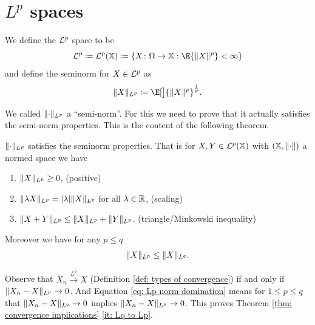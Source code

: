 \section[\texorpdfstring{\(L^p\)}{Lp} spaces]{\texorpdfstring{\(L^p\)}{Lp} spaces  }
\label{sec: Lp spaces}

\begin{definition}
    We define the \(\mathcal{L}^p\) space to be
    \[
        \cL^p \coloneq \cL^p(\domain) \coloneq \set{X\colon \Omega \to \domain : \E{\norm{X}^p} < \infty}
    \]
    and define the seminorm for \(X\in \mathcal{L}^p\) as
    \[
        \norm{X}_{L^p} \coloneq \E[\big]{\norm{X}^p}^{\frac1p}.
    \]
\end{definition}

We called \(\lVert\cdot\rVert_{L^p}\) a ``semi-norm''. For this we need to prove that
it actually satisfies the semi-norm properties. This is the content of the
following theorem.

\begin{theorem}
    \label{thm: seminorm properties}
    \(\lVert\cdot\rVert_{L^p}\) satisfies the seminorm properties. That is for \(X,Y
    \in \mathcal{L}^p(\mathbb{X})\) with \((\mathbb{X}, \lVert\cdot\rVert)\) a normed space we have
    \begin{enumerate}[label=(\roman*)]
        \item\label{it: positive}
        \(\lVert X\rVert_{L^p} \ge 0\),
        \hfill (positive)
        \item\label{it: scaling}
        \(\lVert\lambda X\rVert_{L^p} = |\lambda| \lVert X\rVert_{L^p}\)
        for all \(\lambda \in \mathbb{R}\),
        \hfill (scaling)
        \item\label{it: triangle inequality}
        \(\lVert X + Y\rVert_{L^p} \le \lVert X\rVert_{L^p} + \lVert Y\rVert_{L^p}\).
        \hfill (triangle/Minkowski inequality)
    \end{enumerate}
    Moreover we have for any \(p \le q\)
    \begin{equation}
        \label{eq: Lp norm domination}
        \lVert X\rVert_{L^p} \le \lVert X\rVert_{L^q}.
    \end{equation}
\end{theorem}

\begin{remark}[\(L^p\) convergence]
    \label{rem: Lp convergence}
    Observe that \(X_n \xrightarrow{L^p} X\) (Definition \ref{def: types of convergence}) if and only if \(\lVert X_n -X\rVert_{L^p} \to
    0\). And Equation \eqref{eq: Lp norm domination} means for \(1\le p\le q\) that \(\lVert X_n - X\rVert_{L^q} \to 0\) implies \(\lVert X_n - X\rVert_{L^p} \to 0\).
    This proves Theorem \ref{thm: convergence implications} \ref{it: Lq to Lp}.
\end{remark}


